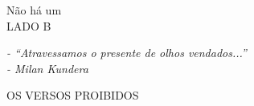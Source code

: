 \documentclass[20pt]{book}
\begin{document}

\clearpage

\clearpage

\clearpage

\clearpage

\clearpage

\clearpage

\clearpage

\clearpage

\clearpage

\clearpage

\clearpage


\vspace*{\fill}
\begin{center}
\large{Não há um}\\
\Large{
LADO B}\label{Lado B}
\end{center}
\begin{flushright}
\large{
\textit{- “Atravessamos o presente de olhos vendados...”\\
- Milan Kundera}
}
\end{flushright}
\vspace{\fill}


\clearpage

\clearpage

\clearpage

\clearpage

\clearpage

\clearpage

\vspace*{\fill}
\begin{center}
\Large{
OS VERSOS PROIBIDOS}
\end{center}
\vspace{\fill}


\clearpage

\clearpage

\clearpage

\clearpage

\vspace*{\fill}
\begin{minipage}{\textwidth}
\\
\\
\end{minipage}
\vspace{\fill}


\clearpage

\vspace*{\fill}
\begin{minipage}{\textwidth}
\\
\\
\\
\end{minipage}
\vspace{\fill}
\end{document}
